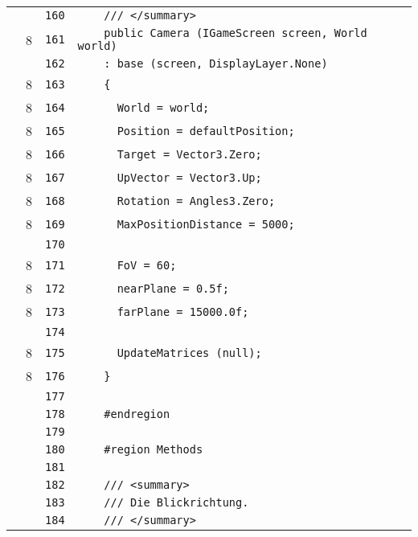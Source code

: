 \documentclass[a4paper,10pt]{article}
\begin{document}
\begin{longtable}[l]{lrrl}
\cellcolor{gray} &  & \verb~160~ & \verb~    /// </summary>~\\
\cellcolor{green} & 8 & \verb~161~ & \verb~    public Camera (IGameScreen screen, World world)~\\
\cellcolor{gray} &  & \verb~162~ & \verb~    : base (screen, DisplayLayer.None)~\\
\cellcolor{green} & 8 & \verb~163~ & \verb~    {~\\
\cellcolor{green} & 8 & \verb~164~ & \verb~      World = world;~\\
\cellcolor{green} & 8 & \verb~165~ & \verb~      Position = defaultPosition;~\\
\cellcolor{green} & 8 & \verb~166~ & \verb~      Target = Vector3.Zero;~\\
\cellcolor{green} & 8 & \verb~167~ & \verb~      UpVector = Vector3.Up;~\\
\cellcolor{green} & 8 & \verb~168~ & \verb~      Rotation = Angles3.Zero;~\\
\cellcolor{green} & 8 & \verb~169~ & \verb~      MaxPositionDistance = 5000;~\\
\cellcolor{gray} &  & \verb~170~ & \verb~~\\
\cellcolor{green} & 8 & \verb~171~ & \verb~      FoV = 60;~\\
\cellcolor{green} & 8 & \verb~172~ & \verb~      nearPlane = 0.5f;~\\
\cellcolor{green} & 8 & \verb~173~ & \verb~      farPlane = 15000.0f;~\\
\cellcolor{gray} &  & \verb~174~ & \verb~~\\
\cellcolor{green} & 8 & \verb~175~ & \verb~      UpdateMatrices (null);~\\
\cellcolor{green} & 8 & \verb~176~ & \verb~    }~\\
\cellcolor{gray} &  & \verb~177~ & \verb~~\\
\cellcolor{gray} &  & \verb~178~ & \verb~    #endregion~\\
\cellcolor{gray} &  & \verb~179~ & \verb~~\\
\cellcolor{gray} &  & \verb~180~ & \verb~    #region Methods~\\
\cellcolor{gray} &  & \verb~181~ & \verb~~\\
\cellcolor{gray} &  & \verb~182~ & \verb~    /// <summary>~\\
\cellcolor{gray} &  & \verb~183~ & \verb~    /// Die Blickrichtung.~\\
\cellcolor{gray} &  & \verb~184~ & \verb~    /// </summary>~\\

\end{longtable}
\end{document}
